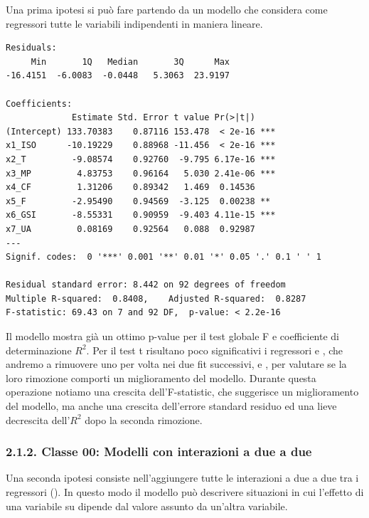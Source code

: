 Una prima ipotesi si può fare partendo da un modello che considera come regressori tutte le variabili indipendenti in maniera lineare.

\begin{lstlisting}[style=rconsole,caption={fit0}]
Residuals:
     Min       1Q   Median       3Q      Max
-16.4151  -6.0083  -0.0448   5.3063  23.9197

Coefficients:
             Estimate Std. Error t value Pr(>|t|)
(Intercept) 133.70383    0.87116 153.478  < 2e-16 ***
x1_ISO      -10.19229    0.88968 -11.456  < 2e-16 ***
x2_T         -9.08574    0.92760  -9.795 6.17e-16 ***
x3_MP         4.83753    0.96164   5.030 2.41e-06 ***
x4_CF         1.31206    0.89342   1.469  0.14536
x5_F         -2.95490    0.94569  -3.125  0.00238 **
x6_GSI       -8.55331    0.90959  -9.403 4.11e-15 ***
x7_UA         0.08169    0.92564   0.088  0.92987
---
Signif. codes:  0 '***' 0.001 '**' 0.01 '*' 0.05 '.' 0.1 ' ' 1

Residual standard error: 8.442 on 92 degrees of freedom
Multiple R-squared:  0.8408,    Adjusted R-squared:  0.8287
F-statistic: 69.43 on 7 and 92 DF,  p-value: < 2.2e-16
\end{lstlisting}

Il modello \texttt{} mostra già un ottimo p-value per il test globale F e coefficiente di determinazione $R^2$. Per il test t risultano poco significativi i regressori \texttt{} e \texttt{}, che andremo a rimuovere uno per volta nei due fit successivi, \texttt{} e \texttt{}, per valutare se la loro rimozione comporti un miglioramento del modello. Durante questa operazione notiamo una crescita dell'F-statistic, che suggerisce un miglioramento del modello, ma anche una crescita dell'errore standard residuo ed una lieve decrescita dell'$R^2$ dopo la seconda rimozione.

\subsubsection{2.1.2. Classe 00: Modelli con interazioni a due a due}
\label{sec:212-classe-00-modelli-con-interazioni-a-due-a-due}

Una seconda ipotesi consiste nell'aggiungere tutte le interazioni a due a due tra i regressori (\texttt{}). In questo modo il modello può descrivere situazioni in cui l'effetto di una variabile su \texttt{} dipende dal valore assunto da un'altra variabile.

